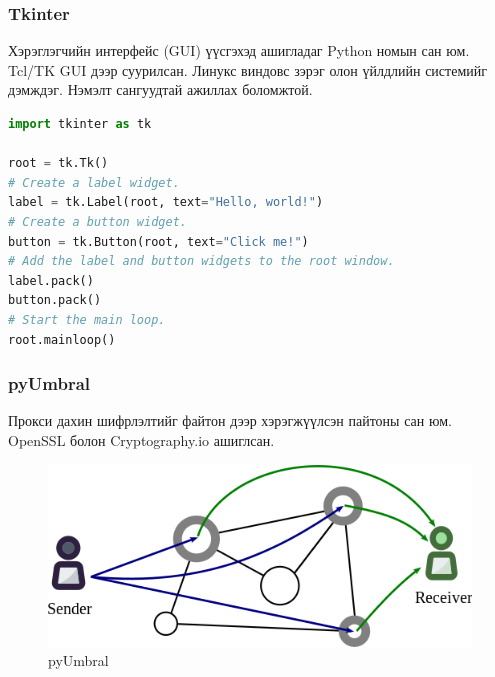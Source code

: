\subsubsection*{\textbf{Tkinter}}
Хэрэглэгчийн интерфейс (GUI) үүсгэхэд ашигладаг Python номын сан юм. Tcl/TK GUI дээр суурилсан. Линукс виндовс зэрэг олон үйлдлийн системийг дэмждэг. Нэмэлт сангуудтай ажиллах боломжтой.
\begin{lstlisting}[language=Python, caption={Энгийн цонх үүсгэж буй код}, captionpos=b]
import tkinter as tk

root = tk.Tk()
# Create a label widget.
label = tk.Label(root, text="Hello, world!")
# Create a button widget.
button = tk.Button(root, text="Click me!")
# Add the label and button widgets to the root window.
label.pack()
button.pack()
# Start the main loop.
root.mainloop()
\end{lstlisting}
\subsubsection*{\textbf{pyUmbral}}
Прокси дахин шифрлэлтийг файтон дээр хэрэгжүүлсэн пайтоны сан юм. OpenSSL болон Cryptography.io ашиглсан.
\begin{figure}[ht]
    \centering
    \includegraphics[scale=0.5]{Figures/umbral.png}
    \caption[pyUmbral]{pyUmbral}
    \label{fig:pyUmbral}
\end{figure}

